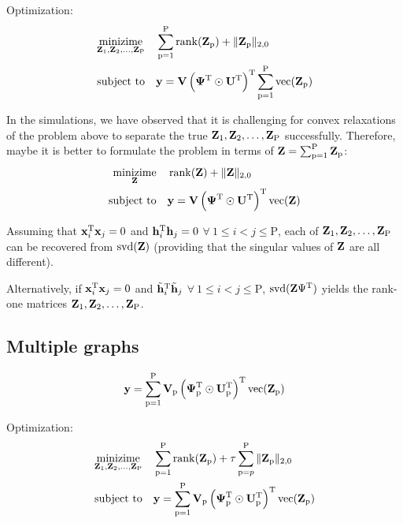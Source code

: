 \documentclass{article}
\newcommand{\numSources}{\text{P}}
\newcommand{\sourceIndex}{\text{p}}
\DeclareMathOperator{\vect}{vec}
\DeclareMathOperator{\rank}{rank}
\DeclareMathOperator{\svd}{svd}
\begin{document}
Optimization:
\begin{align}
  \mathop{\text{minizime}}_{\bbZ_{1},\bbZ_{2},\ldots,\bbZ_{\numSources}} \quad & \sum_{\sourceIndex=1}^{\numSources} \rank(\bbZ_{\sourceIndex}) + \|\bbZ_{\sourceIndex}\|_{2,0} \\
  \text{subject to} \quad & \bby = \bbV \left(\bbPsi^{\rmT} \odot \bbU^{\rmT} \right)^{\rmT}\sum_{\sourceIndex=1}^{\numSources} \vect(\bbZ_{\sourceIndex}) \nonumber
\end{align}

In the simulations, we have observed that it is challenging for convex relaxations of the problem above to separate the true $\bbZ_{1},\bbZ_{2},\ldots,\bbZ_{\numSources}$ successfully. Therefore, maybe it is better to formulate the problem in terms of $\bbZ = \sum_{\sourceIndex=1}^{\numSources} \bbZ_{\sourceIndex}$:
\begin{align}
  \mathop{\text{minizime}}_{\bbZ} \quad & \rank(\bbZ) + \|\bbZ\|_{2,0} \\
  \text{subject to} \quad & \bby = \bbV \left(\bbPsi^{\rmT} \odot \bbU^{\rmT} \right)^{\rmT} \vect(\bbZ) \nonumber
\end{align}

Assuming that ${\mathbf x}_{i}^{{\text{T}}} {\mathbf x}_{j} = 0$ and ${\mathbf h}_{i}^{{\text{T}}} {\mathbf h}_{j} = 0$ $\forall \ 1 \leqslant i < j \leqslant \numSources$, each of $\bbZ_{1},\bbZ_{2},\ldots,\bbZ_{\numSources}$ can be recovered from $\svd(\bbZ)$ (providing that the singular values of ${\mathbf Z}$ are all different).

Alternatively, if ${\mathbf x}_{i}^{{\text{T}}} {\mathbf x}_{j} = 0$ and $\tilde {{\mathbf h}}_{i}^{{\text{T}}} \tilde {{\mathbf h}}_{j}$ $\forall \ 1 \leqslant i < j \leqslant \numSources$, $\svd(\bbZ \Psi^{\rmT})$ yields the rank-one matrices $\bbZ_{1},\bbZ_{2},\ldots,\bbZ_{\numSources}$.

\subsection*{Multiple graphs}

\begin{equation}
  \bby = \sum_{\sourceIndex=1}^{\numSources} \bbV_{\sourceIndex} \left(\bbPsi_{\sourceIndex}^{\rmT} \odot \bbU_{\sourceIndex}^{\rmT} \right)^{\rmT} \vect(\bbZ_{\sourceIndex})
\end{equation}

Optimization:
\begin{align}
  \mathop{\text{minizime}}_{\bbZ_{1},\bbZ_{2},\ldots,\bbZ_{\numSources}} \quad & \sum_{\sourceIndex=1}^{\numSources} \rank(\bbZ_{\sourceIndex}) + \tau \sum_{\sourceIndex=p}^{\numSources} \|\bbZ_{\sourceIndex}\|_{2,0} \\
  \text{subject to} \quad & \bby = \sum_{\sourceIndex=1}^{\numSources} \bbV_{\sourceIndex} \left(\bbPsi_{\sourceIndex}^{\rmT} \odot \bbU_{\sourceIndex}^{\rmT} \right)^{\rmT} \vect(\bbZ_{\sourceIndex}) \nonumber
\end{align}
\end{document}
